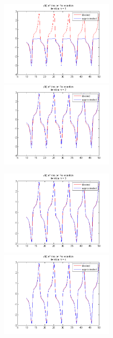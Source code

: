 \begin{figure}[ht!]
	\centering
	
	\subfloat
	{\includegraphics[width=0.5\textwidth]
	{images/deriv_iter1.png}}
	\subfloat
	{\includegraphics[width=0.5\textwidth]
	{images/deriv_iter2.png}}
	
	\subfloat
	{\includegraphics[width=0.5\textwidth]
	{images/deriv_iter3.png}}
	\subfloat
	{\includegraphics[width=0.5\textwidth]
	{images/deriv_iter4.png}}


\end{figure}
